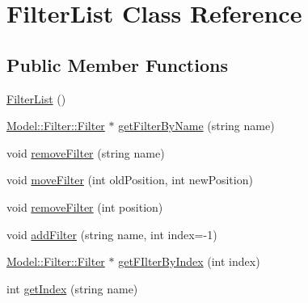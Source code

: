 \hypertarget{classModel_1_1Filter_1_1FilterList}{}\section{Filter\+List Class Reference}
\label{classModel_1_1Filter_1_1FilterList}
\subsection*{Public Member Functions}
\begin{DoxyCompactItemize}
\item 
\hyperlink{classModel_1_1Filter_1_1FilterList_a01ca9d807b9f410ea40bd70743337638}{Filter\+List} ()
\item 
\hyperlink{classModel_1_1Filter_1_1Filter}{Model\+::\+Filter\+::\+Filter} $\ast$ \hyperlink{classModel_1_1Filter_1_1FilterList_a68d6649734a77b62ff70fe51eb2f616f}{get\+Filter\+By\+Name} (string name)
\item 
void \hyperlink{classModel_1_1Filter_1_1FilterList_acfe5b66a730352a58df782209557ba82}{remove\+Filter} (string name)
\item 
void \hyperlink{classModel_1_1Filter_1_1FilterList_a13c4ca4bd21b65ab2e2f01556338d095}{move\+Filter} (int old\+Position, int new\+Position)
\item 
void \hyperlink{classModel_1_1Filter_1_1FilterList_a3cd55a8f60d5021235199170937644c5}{remove\+Filter} (int position)
\item 
void \hyperlink{classModel_1_1Filter_1_1FilterList_a0977e76495c1328c469f31dac97ef60d}{add\+Filter} (string name, int index=-\/1)
\item 
\hyperlink{classModel_1_1Filter_1_1Filter}{Model\+::\+Filter\+::\+Filter} $\ast$ \hyperlink{classModel_1_1Filter_1_1FilterList_a6ff3640f04dcd1ff8fd1589839b866fe}{get\+F\+Ilter\+By\+Index} (int index)
\item 
int \hyperlink{classModel_1_1Filter_1_1FilterList_afe5620a51c1e0946f79d6c2a4f7ac340}{get\+Index} (string name)
\end{DoxyCompactItemize}
